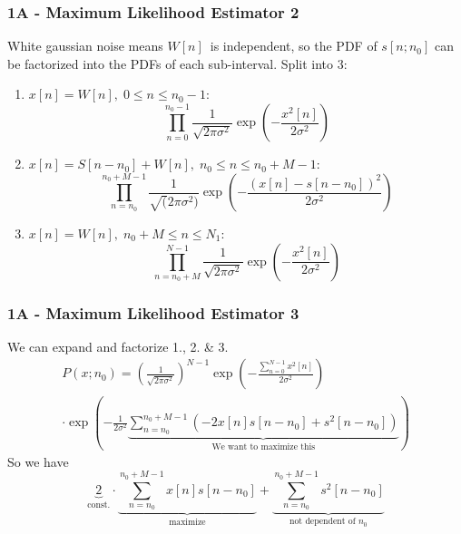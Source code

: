 \documentclass[compress]{beamer}
\begin{document}
\begin{frame} %
    \frametitle{1A - Maximum Likelihood Estimator 2}
    White gaussian noise means $W[n]$ is independent, so the PDF of $s[n;n_0]$
    can be factorized into the PDFs of each sub-interval.
    Split into 3:
    \begin{enumerate}
        \item $x[n]=W[n],\; 0 \le n \le n_0-1$:
            \begin{equation*}
                \prod^{n_0-1}_{n=0}{\frac{1}{\sqrt{2\pi\sigma^2}}
                \exp\left(-\frac{x^2[n]}{2 \sigma^2}\right)}
            \end{equation*}
        \item $x[n]=S\left[n-n_0\right]+W[n], \; n_0 \le n \le n_0+M-1$:
            \begin{equation*}
                \prod^{n_0+M-1}_{n=n_0}{\frac{1}{\sqrt(2\pi\sigma^2)}
                \exp\left(-\frac{\left(x[n]-s[n-n_0]\right)^2}{2\sigma^2}\right)}
            \end{equation*}
        \item $x[n] = W[n], \; n_0+M \le n \le N_1$:
            \begin{equation*}
                \prod^{N-1}_{n=n_0+M}{\frac{1}{\sqrt{2\pi\sigma^2}}
                \exp\left(-\frac{x^2[n]}{2\sigma^2}\right)}
            \end{equation*}
    \end{enumerate}
\end{frame} %

\begin{frame} %
    \frametitle{1A - Maximum Likelihood Estimator 3}
    We can expand and factorize 1., 2. \& 3. 
    \begin{gather*}
        P(x; n_0)  = \left(\frac{1}{\sqrt{2\pi\sigma^2}}\right)^{N-1}
        \exp\left(-\frac{\sum^{N-1}_{n=0}{x^2[n]}}{2\sigma^2}\right) \\
        \cdot\exp\left(
            -\frac{1}{2\sigma^2}
            \underbrace{
                \sum^{n_0+M-1}_{n=n_0}{\left(
                        -2x[n]s[n-n_0]+s^2[n-n_0]
                \right)}
            }_{\text{We want to maximize this}}
        \right)
    \end{gather*}
    So we have 
    \begin{equation*}
        \underbrace{2}_{\text{const.}}
        \cdot
        \underbrace{
            \sum^{n_0+M-1}_{n=n_0}{x[n]s[n-n_0]}
        }_{\text{maximize}}
        +
        \underbrace{
            \sum^{n_0+M-1}_{n=n_0}{s^2[n-n_0]}
        }_{\text{not dependent of } n_0}
    \end{equation*}
\end{frame} %
\end{document}
